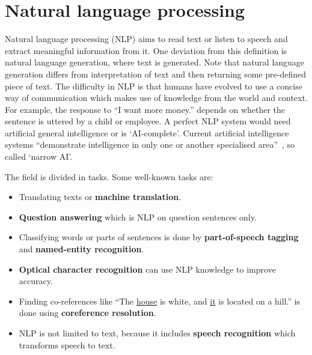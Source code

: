 \section{Natural language processing}
\label{sec:nlp}

Natural language processing (NLP) aims to read text or listen to speech and extract meaningful information from it.
One deviation from this definition is natural language generation, where text is generated.
Note that natural language generation differs from interpretation of text and then returning some pre-defined piece of text.
The difficulty in NLP is that humans have evolved to use a concise way of communication which makes use of knowledge from the world and context.
For example, the response to ``I want more money.'' depends on whether the sentence is uttered by a child or employee.
A perfect NLP system would need artificial general intelligence or is `AI-complete'.
Current artificial intelligence systems ``demonstrate intelligence in only one or another specialised area''~\citep{pennachin2007contemporary}, so called `narrow AI'.

The field is divided in tasks.
Some well-known tasks are:
\begin{itemize}
    \item Translating texts or \textbf{machine translation}.
    \item \textbf{Question answering} which is NLP on question sentences only.
    \item Classifying words or parts of sentences is done by \textbf{part-of-speech tagging} and \textbf{named-entity recognition}.
    \item \textbf{Optical character recognition} can use NLP knowledge to improve accuracy.
    \item Finding co-references like ``The \underline{house} is white, and \underline{it} is located on a hill.'' is done using \textbf{coreference resolution}.
    \item NLP is not limited to text, because it includes \textbf{speech recognition} which transforms speech to text.
\end{itemize}

